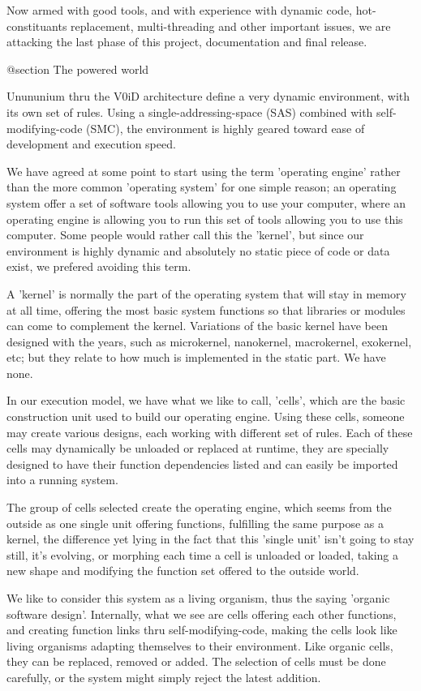 Now armed with good tools, and with experience with dynamic code,
hot-constituants replacement, multi-threading and other important issues, we
are attacking the last phase of this project, documentation and final release.


@section The powered world

Unununium thru the V0iD architecture define a very dynamic environment, with
its own set of rules.  Using a single-addressing-space (SAS) combined with
self-modifying-code (SMC), the environment is highly geared toward ease of
development and execution speed.

We have agreed at some point to start using the term 'operating engine' rather
than the more common 'operating system' for one simple reason; an operating
system offer a set of software tools allowing you to use your computer, where
an operating engine is allowing you to run this set of tools allowing you to
use this computer.  Some people would rather call this the 'kernel', but since
our environment is highly dynamic and absolutely no static piece of code or
data exist, we prefered avoiding this term.

A 'kernel' is normally the part of the operating system that will stay in
memory at all time, offering the most basic system functions so that libraries
or modules can come to complement the kernel.  Variations of the basic kernel
have been designed with the years, such as microkernel, nanokernel,
macrokernel, exokernel, etc; but they relate to how much is implemented in the
static part.  We have none.

In our execution model, we have what we like to call, 'cells', which are the
basic construction unit used to build our operating engine.  Using these
cells, someone may create various designs, each working with different set of
rules.  Each of these cells may dynamically be unloaded or replaced at runtime,
they are specially designed to have their function dependencies listed and
can easily be imported into a running system.

The group of cells selected create the operating engine, which seems from the
outside as one single unit offering functions, fulfilling the same purpose as
a kernel, the difference yet lying in the fact that this 'single unit' isn't
going to stay still, it's evolving, or morphing each time a cell is unloaded or
loaded, taking a new shape and modifying the function set offered to the
outside world.

We like to consider this system as a living organism, thus the saying 'organic
software design'. Internally, what we see are cells offering each other
functions, and creating function links thru self-modifying-code, making the
cells look like living organisms adapting themselves to their environment.
Like organic cells, they can be replaced, removed or added.  The selection of
cells must be done carefully, or the system might simply reject the latest
addition.

